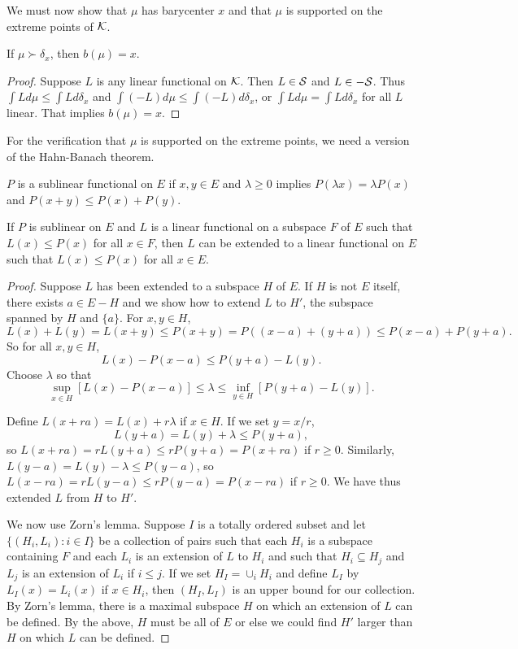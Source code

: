 We must now show that $\mu$ has barycenter $x$ and that $\mu$ is supported on the extreme points of $\mathcal{K}$.

\begin{proposition}\label{prop:ch2_7.13}
If $\mu\succ\delta_x$, then $b(\mu) = x$.
\end{proposition}

\begin{proof}
Suppose $L$ is any linear functional on $\mathcal{K}$. Then $L \in \mathcal{S}$ and $L \in -\mathcal{S}$. Thus $\int Ld\mu \leq \int Ld\delta_x$ and $\int(-L)d\mu \leq \int(-L)d\delta_x$, or $\int Ld\mu = \int Ld\delta_x$ for all $L$ linear. That implies $b(\mu) = x$.
\end{proof}

For the verification that $\mu$ is supported on the extreme points, we need a version of the Hahn-Banach theorem.

\begin{definition}\label{def:ch2_7.14}
$P$ is a sublinear functional on $E$ if $x,y \in E$ and $\lambda \geq 0$ implies $P(\lambda x) = \lambda P(x)$ and $P(x + y) \leq P(x) + P(y)$.
\end{definition}

\begin{theorem}\label{thm:ch2_7.15}
If $P$ is sublinear on $E$ and $L$ is a linear functional on a subspace $F$ of $E$ such that $L(x) \leq P(x)$ for all $x \in F$, then $L$ can be extended to a linear functional on $E$ such that $L(x) \leq P(x)$ for all $x \in E$.
\end{theorem}

\begin{proof}
Suppose $L$ has been extended to a subspace $H$ of $E$. If $H$ is not $E$ itself, there exists $a \in E - H$ and we show how to extend $L$ to $H'$, the subspace spanned by $H$ and $\{a\}$. For $x,y \in H$,
\[
    L(x)+L(y) = L(x+y) \leq P(x+y) = P((x-a)+(y+a)) \leq P(x-a)+P(y+a).
\]
So for all $x,y \in H$,
\[
    L(x) - P(x - a) \leq P(y + a) - L(y).
\]
Choose $\lambda$ so that
\[
    \sup_{x\in H}[L(x) - P(x - a)] \leq \lambda \leq \inf_{y\in H}[P(y + a) - L(y)].
\]

Define $L(x + ra) = L(x) + r\lambda$ if $x \in H$. If we set $y = x/r$,
\[
    L(y + a) = L(y) + \lambda \leq P(y + a),
\]
so $L(x + ra) = rL(y + a) \leq rP(y + a) = P(x + ra)$ if $r \geq 0$. Similarly, $L(y - a) = L(y) - \lambda \leq P(y - a)$, so $L(x - ra) = rL(y - a) \leq rP(y - a) = P(x - ra)$ if $r \geq 0$. We have thus extended $L$ from $H$ to $H'$.

We now use Zorn's lemma. Suppose $I$ is a totally ordered subset and let $\{(H_i,L_i) : i \in I\}$ be a collection of pairs such that each $H_i$ is a subspace containing $F$ and each $L_i$ is an extension of $L$ to $H_i$ and such that $H_i \subseteq H_j$ and $L_j$ is an extension of $L_i$ if $i \leq j$. If we set $H_I = \cup_iH_i$ and define $L_I$ by $L_I(x) = L_i(x)$ if $x \in H_i$, then $(H_I,L_I)$ is an upper bound for our collection. By Zorn's lemma, there is a maximal subspace $H$ on which an extension of $L$ can be defined. By the above, $H$ must be all of $E$ or else we could find $H'$ larger than $H$ on which $L$ can be defined.
\end{proof}

